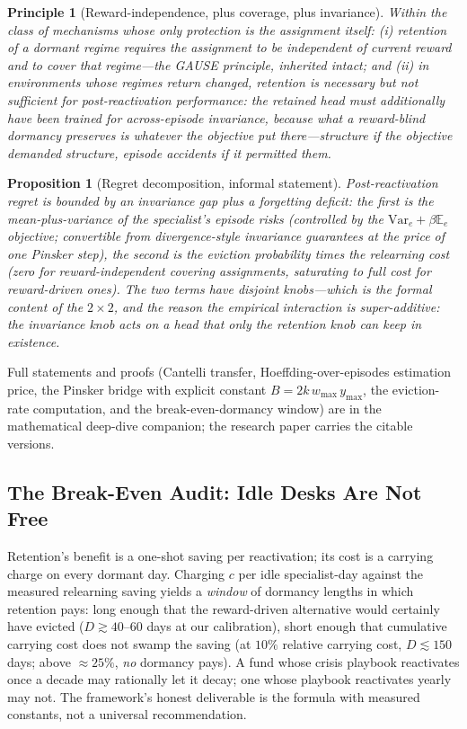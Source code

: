 \documentclass[10pt]{article}
\newtheorem{principle}{Principle}
\newtheorem{proposition}{Proposition}
\newcommand{\E}{\mathbb{E}}
\newcommand{\Var}{\mathrm{Var}}
\begin{document}
\begin{principle}[Reward-independence, plus coverage, plus invariance]
\label{prin:ria}
Within the class of mechanisms whose only protection is the assignment
itself: (i) retention of a dormant regime requires the assignment to be
independent of current reward \emph{and} to cover that regime---the GAUSE
principle, inherited intact; and (ii) in environments whose regimes
return \emph{changed}, retention is necessary but not sufficient for
post-reactivation performance: the retained head must additionally have
been trained for across-episode invariance, because what a reward-blind
dormancy preserves is whatever the objective put there---structure if the
objective demanded structure, episode accidents if it permitted them.
\end{principle}

\begin{proposition}[Regret decomposition, informal statement]
\label{prin:ria-prop}
Post-reactivation regret is bounded by an \emph{invariance gap} plus a
\emph{forgetting deficit}: the first is the mean-plus-variance of the
specialist's episode risks (controlled by the $\Var_e + \beta \E_e$
objective; convertible from divergence-style invariance guarantees at the
price of one Pinsker step), the second is the eviction probability times
the relearning cost (zero for reward-independent covering assignments,
saturating to full cost for reward-driven ones). The two terms have
disjoint knobs---which is the formal content of the $2{\times}2$, and the
reason the empirical interaction is super-additive: the invariance knob
acts on a head that only the retention knob can keep in existence.
\end{proposition}

Full statements and proofs (Cantelli transfer, Hoeffding-over-episodes
estimation price, the Pinsker bridge with explicit constant
$B = 2 k\, w_{\max}\, y_{\max}$, the eviction-rate computation, and the
break-even-dormancy window) are in the mathematical deep-dive companion;
the research paper carries the citable versions.

\subsection{The Break-Even Audit: Idle Desks Are Not Free}

Retention's benefit is a one-shot saving per reactivation; its cost is a
carrying charge on every dormant day. Charging $c$ per idle
specialist-day against the measured relearning saving yields a
\emph{window} of dormancy lengths in which retention pays: long enough
that the reward-driven alternative would certainly have evicted
($D \gtrsim 40$--$60$ days at our calibration), short enough that
cumulative carrying cost does not swamp the saving (at $10\%$ relative
carrying cost, $D \lesssim 150$ days; above $\approx 25\%$, \emph{no}
dormancy pays). A fund whose crisis playbook reactivates once a decade
may rationally let it decay; one whose playbook reactivates yearly may
not. The framework's honest deliverable is the formula with measured
constants, not a universal recommendation.
\end{document}
